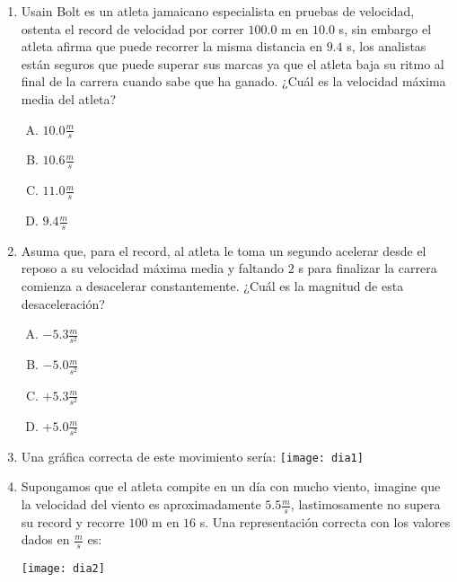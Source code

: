 \begin{enumerate}


\item Usain Bolt es un atleta jamaicano especialista en pruebas de velocidad, ostenta el record de velocidad por correr $100.0$ m en $10.0$ s, sin embargo el atleta afirma que puede recorrer la misma distancia en $9.4$ s, los analistas están seguros que puede superar sus marcas ya que el atleta baja su ritmo al final de la carrera cuando sabe que ha ganado. ¿Cuál es la velocidad máxima media del atleta? \label{dia-1}

\begin{enumerate}[(A)]
\item $10.0\frac{m}{s}$
\item $10.6\frac{m}{s}$
\item $11.0\frac{m}{s}$
\item $9.4\frac{m}{s}$
\end{enumerate}

\item Asuma que, para el record, al atleta le toma un segundo acelerar desde el reposo a su velocidad máxima media y faltando $2$ s para finalizar la carrera comienza a desacelerar constantemente. ¿Cuál es la magnitud de esta desaceleración?\label{dia-2}

\begin{enumerate}[(A)]
\item $-5.3 \frac{m}{s^2}$
\item $-5.0 \frac{m}{s^2}$
\item $+5.3 \frac{m}{s^2}$
\item $+5.0 \frac{m}{s^2}$
\end{enumerate}

\item Una gráfica correcta de este movimiento sería: \label{dia-3}
\texttt{[image: dia1]}



\item Supongamos que el atleta compite en un día con mucho viento, imagine que la velocidad del viento es aproximadamente $5.5\frac{m}{s}$, lastimosamente no supera su record y recorre $100$ m en $16$ s. \label{dia-4}
\noindent Una representación correcta con los valores dados en $\frac{m}{s}$ es:

\texttt{[image: dia2]}


\end{enumerate}
